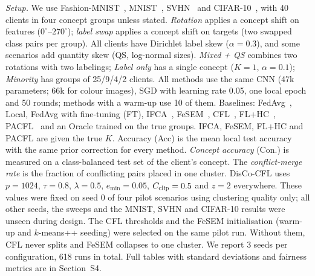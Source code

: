 \documentclass[journal]{IEEEtran}
\theoremstyle{definition}
\begin{document}
\emph{Setup.} We use Fashion-MNIST~\cite{xiao2017fmnist}, MNIST~\cite{lecun1998mnist}, SVHN~\cite{netzer2011svhn} and CIFAR-10~\cite{krizhevsky2009cifar}, with 40 clients in four concept groups unless stated. \emph{Rotation} applies a concept shift on features ($0^\circ$--$270^\circ$); \emph{label swap} applies a concept shift on targets (two swapped class pairs per group). All clients have Dirichlet label skew ($\alpha=0.3$), and some scenarios add quantity skew (QS, log-normal sizes). \emph{Mixed + QS} combines two rotations with two labelings; \emph{Label only} has a single concept ($K=1$, $\alpha=0.1$); \emph{Minority} has groups of 25/9/4/2 clients. All methods use the same CNN (47k parameters; 66k for colour images), SGD with learning rate 0.05, one local epoch and 50 rounds; methods with a warm-up use 10 of them. Baselines: FedAvg~\cite{mcmahan2017fedavg}, Local, FedAvg with fine-tuning (FT), IFCA~\cite{ghosh2020ifca}, FeSEM~\cite{long2023fesem}, CFL~\cite{sattler2021cfl}, FL+HC~\cite{briggs2020flhc}, PACFL~\cite{vahidian2023pacfl} and an Oracle trained on the true groups. IFCA, FeSEM, FL+HC and PACFL are given the true $K$. Accuracy (Acc) is the mean local test accuracy with the same prior correction for every method. \emph{Concept accuracy} (Con.) is measured on a class-balanced test set of the client's concept. The \emph{conflict-merge rate} is the fraction of conflicting pairs placed in one cluster. DisCo-CFL uses $p=1024$, $\tau=0.8$, $\lambda=0.5$, $e_{\min}=0.05$, $C_{\rm clip}=0.5$ and $z=2$ everywhere. These values were fixed on seed 0 of four pilot scenarios using clustering quality only; all other seeds, the sweeps and the MNIST, SVHN and CIFAR-10 results were unseen during design. The CFL thresholds and the FeSEM initialisation (warm-up and $k$-means++ seeding) were selected on the same pilot run. Without them, CFL never splits and FeSEM collapses to one cluster. We report 3 seeds per configuration, 618 runs in total. Full tables with standard deviations and fairness metrics are in Section~S4.

\begin{table}[t]
\centering
\caption{Fashion-MNIST: mean local accuracy (Acc) and concept accuracy (Con.) in \%, 3 seeds, with prior correction for all methods. Best non-oracle value in bold.}\label{tab:fmnist}
\footnotesize

\end{table}

\begin{table}[t]
\centering
\caption{MNIST, SVHN and CIFAR-10 (same metrics). DisCo-T30: DisCo-CFL with 30 warm-up rounds.}\label{tab:other}
\footnotesize

\end{table}
\end{document}
